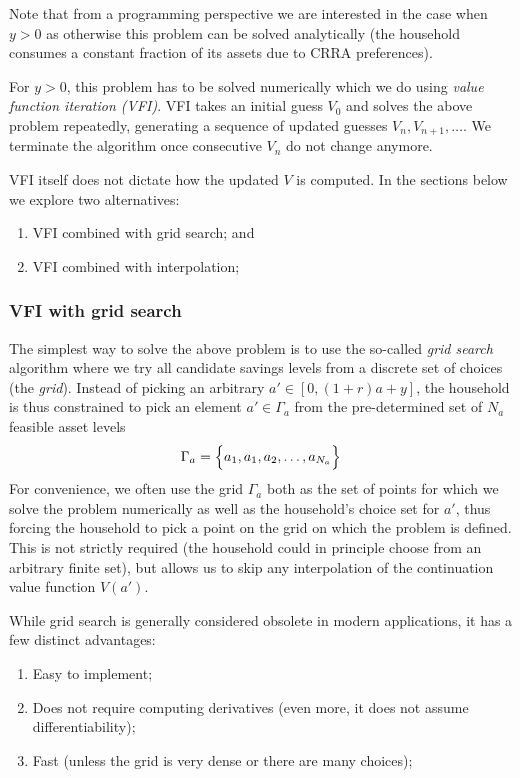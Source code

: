 \documentclass{scrartcl}
\providecommand{\tightlist}{%
      \setlength{\itemsep}{0pt}\setlength{\parskip}{0pt}}
\begin{document}
Note that from a programming perspective we are interested in the case
when \(y > 0\) as otherwise this problem can be solved analytically (the
household consumes a constant fraction of its assets due to CRRA
preferences).

For \(y > 0\), this problem has to be solved numerically which we do
using \emph{value function iteration (VFI)}. VFI takes an initial guess
\(V_0\) and solves the above problem repeatedly, generating a sequence
of updated guesses \(V_n, V_{n+1}, \dots\). We terminate the algorithm
once consecutive \(V_n\) do not change anymore.

VFI itself does not dictate how the updated \(V\) is computed. In the
sections below we explore two alternatives:

\begin{enumerate}
\def\labelenumi{\arabic{enumi}.}
\tightlist
\item
  VFI combined with grid search; and
\item
  VFI combined with interpolation;
\end{enumerate}

    \hypertarget{vfi-with-grid-search}{%
\subsubsection{VFI with grid search}\label{vfi-with-grid-search}}

The simplest way to solve the above problem is to use the so-called
\emph{grid search} algorithm where we try all candidate savings levels
from a discrete set of choices (the \emph{grid}). Instead of picking an
arbitrary \(a' \in [0, (1+r)a + y]\), the household is thus constrained
to pick an element \(a' \in \Gamma_{a}\) from the pre-determined set of
\(N_a\) feasible asset levels \[
\Gamma_{a} = \Bigl\{a_1, a_1, a_2, \dots, a_{N_a} \Bigr\}
\] For convenience, we often use the grid \(\Gamma_a\) both as the set
of points for which we solve the problem numerically as well as the
household's choice set for \(a'\), thus forcing the household to pick a
point on the grid on which the problem is defined. This is not strictly
required (the household could in principle choose from an arbitrary
finite set), but allows us to skip any interpolation of the continuation
value function \(V(a')\).

While grid search is generally considered obsolete in modern
applications, it has a few distinct advantages:

\begin{enumerate}
\def\labelenumi{\arabic{enumi}.}
\tightlist
\item
  Easy to implement;
\item
  Does not require computing derivatives (even more, it does not assume
  differentiability);
\item
  Fast (unless the grid is very dense or there are many choices);
\end{enumerate}
\end{document}
